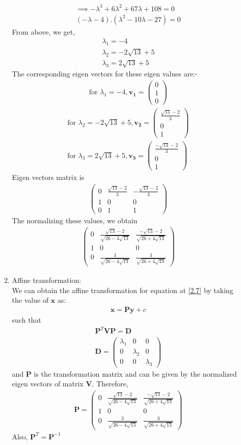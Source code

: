 \documentclass[journal,12pt,twocolumn]{IEEEtran}
\let\vec\mathbf
\numberwithin{equation}{subsection}
\newcommand{\myvec}[1]{\ensuremath{\begin{pmatrix}#1\end{pmatrix}}}
\begin{document}
\begin{enumerate}
\begin{enumerate}
\begin{align}
\implies -\lambda^3 + 6\lambda^2 + 67\lambda + 108 =0 \\
(-\lambda-4).(\lambda^2 -10\lambda -27) = 0
\end{align}
From above, we get,
\begin{align}
\lambda_1 = -4\\
\lambda_2=-2\sqrt{13} + 5\\
\lambda_3=2\sqrt{13} + 5
\end{align}
The corresponding eigen vectors for these eigen values are:-
\begin{align}
\text{for } \lambda_1 = -4 ,\vec{ v_1} = \myvec{0\\1\\0}
\end{align}
\begin{align}
\text{for } \lambda_2=-2\sqrt{13} + 5 , \vec{ v_2}= \myvec{\frac{\sqrt{13} -2}{3}\\0\\1}\\
\text{for } \lambda_3=2\sqrt{13} + 5 , \vec{ v_3} = \myvec{\frac{-\sqrt{13} -2}{3}\\0\\1}
\end{align}
Eigen vectors matrix is
\begin{align}
\myvec{0 &\frac{\sqrt{13} -2}{3}&-\frac{\sqrt{13} -2}{3}\\1 &0&0\\0&1&1}
\end{align}
The normalizing these values, we obtain
\begin{align}
\myvec{0 &\frac{\sqrt{13} -2}{\sqrt{26-4\sqrt{13}}}&\frac{-\sqrt{13} -2}{\sqrt{26+4\sqrt{13}}}\\1 &0&0\\0&\frac{3}{\sqrt{26-4\sqrt{13}}}&\frac{3}{\sqrt{26+4\sqrt{13}}}}
\end{align}
\item Affine transformation:\\
We can obtain the affine transformation for equation at \eqref{2.7} by taking the value of $\vec{x}$ as:
\begin{align}
\vec{x} = \vec{P}\vec{y} + c   \label{2.19.1}
\end{align}
such that
\begin{align}
\vec{P}^T\vec{V}\vec{P}= \vec{D} \\ 
\vec{D}=\myvec{\lambda_1&0&0\\0&\lambda_2&0\\0&0&\lambda_3}
\end{align}
and $\vec{P}$ is the transformation matrix and can be given by the normalized eigen vectors of matrix $\vec{V}$. Therefore,
\begin{align}
\vec{P} = \myvec{0 &\frac{\sqrt{13} -2}{\sqrt{26-4\sqrt{13}}}&\frac{-\sqrt{13} -2}{\sqrt{26+4\sqrt{13}}}\\1 &0&0\\0&\frac{3}{\sqrt{26-4\sqrt{13}}}&\frac{3}{\sqrt{26+4\sqrt{13}}}}
\end{align}
Also, $\vec{P}^T = \vec{P}^{-1}$


\end{enumerate}
\end{enumerate}
\end{document}
